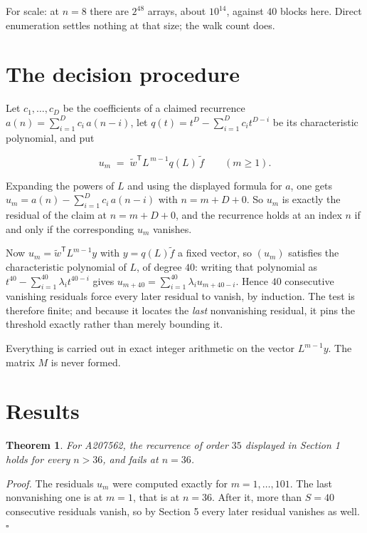 \documentclass[11pt]{article}
\newtheorem{theorem}{Theorem}
\theoremstyle{definition}
\begin{document}
For scale: at $n = 8$ there are $2^{48}$ arrays, about $10^{14}$, against $40$ blocks here. Direct enumeration settles nothing at that size; the walk count does.

\section{The decision procedure}

Let $c_1,\dots,c_D$ be the coefficients of a claimed recurrence $a(n) = \sum_{i=1}^{D} c_i\,a(n-i)$, let $q(t) = t^{D} - \sum_{i=1}^{D} c_i t^{D-i}$ be its characteristic polynomial, and put

\[u_m \;=\; \tilde w^{\mathsf T} L^{\,m-1} q(L)\,\tilde f \qquad (m \ge 1).\]

Expanding the powers of $L$ and using the displayed formula for $a$, one gets $u_m = a(n) - \sum_{i=1}^{D} c_i\,a(n-i)$ with $n = m + D + 0$. So $u_m$ is exactly the residual of the claim at $n = m + D + 0$, and the recurrence holds at an index $n$ if and only if the corresponding $u_m$ vanishes.

Now $u_m = \tilde w^{\mathsf T} L^{m-1} y$ with $y = q(L)\tilde f$ a fixed vector, so $(u_m)$ satisfies the characteristic polynomial of $L$, of degree $40$: writing that polynomial as $t^{40} - \sum_{i=1}^{40} \lambda_i t^{40-i}$ gives $u_{m+40} = \sum_{i=1}^{40} \lambda_i u_{m+40-i}$. Hence $40$ consecutive vanishing residuals force every later residual to vanish, by induction. The test is therefore finite; and because it locates the {\itshape last} nonvanishing residual, it pins the threshold exactly rather than merely bounding it.

Everything is carried out in exact integer arithmetic on the vector $L^{m-1}y$. The matrix $M$ is never formed.

\section{Results}

\begin{theorem} For A207562, the recurrence of order $35$ displayed in Section 1 holds for every $n > 36$, and fails at $n = 36$.\end{theorem}

{\itshape Proof.} The residuals $u_m$ were computed exactly for $m = 1,\dots,101$. The last nonvanishing one is at $m = 1$, that is at $n = 36$. After it, more than $S = 40$ consecutive residuals vanish, so by Section 5 every later residual vanishes as well. $\square$
\end{document}
